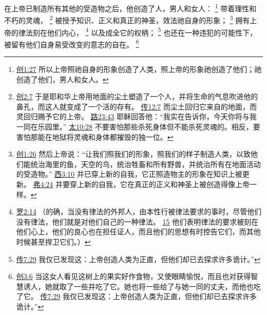 \documentclass[12pt, a4paper, oneside]{ctexart}
\newcounter{parnum}[section]
\newcommand{\N}{%
   \noindent\refstepcounter{parnum}%
    \makebox[\parindent][l]{\textbf{\arabic{parnum}.}}}
\begin{document}
\N 在上帝已制造所有其他的受造物之后，他创造了人，男人和女人：
	\footnote {
		\href{https://biblehub.com/genesis/1-27.htm}{创1:27} 所以上帝照祂自身的形象创造了人类，照上帝的形象祂创造了他们；祂创造了他们，男人和女人。
	}
	带着理性和不朽的灵魂，
	\footnote {
		\href{https://biblehub.com/genesis/2-7.htm}{创2:7} 于是耶和华上帝用地面的尘土塑造了一个人，并将生命的气息吹进他的鼻孔，而这人就变成了一个活的存有。
		\href{https://biblehub.com/ecclesiastes/12-7.htm}{传12:7} 而尘土回归它来自的地面，而灵回归赐予它的上帝。
		\href{https://biblehub.com/luke/23-43.htm}{路23:43} 耶稣回答他：“我实在告诉你，今天你将与我一同在乐园里。”
		\href{https://biblehub.com/matthew/10-28.htm}{太10:28} 不要害怕那些杀死身体但不能杀死灵魂的。相反，要害怕那能在地狱将灵魂和身体都摧毁的独一位。
	}
	被授予知识、正义和真正的神圣，效法祂自身的形象；
	\footnote {
		\href{https://biblehub.com/genesis/1-26.htm}{创1:26} 然后上帝说：“让我们照我们的形象，照我们的样子制造人类，以致他们能统治海里的鱼，天空的鸟，统治牲畜和所有野兽，并统治所有在地面活动的受造物。”
		\href{https://biblehub.com/colossians/3-10.htm}{西3:10} 并已穿上新的自我，它正照造物主的形象在知识上被更新。
		\href{https://biblehub.com/ephesians/4-24.htm}{弗4:24} 并要穿上新的自我，它在真正的正义和神圣上被创造得像上帝一样。
	}
	拥有上帝的律法刻在他们内心，
	\footnote {
		\href{https://biblehub.com/romans/2-14.htm}{罗2:14} （的确，当没有律法的外邦人，由本性行被律法要求的事时，尽管他们没有律法，他们就是对他们自己的一种律法。
		\href{https://biblehub.com/romans/2-15.htm}{15} 他们表明律法的要求被刻在他们心上，他们的良心也在担任证人，而且他们的思想有时控告它们，而其他时候甚至捍卫它们。）
	}
	以及成全它的权柄；
	\footnote {
		\href{https://biblehub.com/ecclesiastes/7-29.htm}{传7:29} 我仅已发现这：上帝创造人类为正直，但他们却已去探求许多诡计。”
	}
	也还在一种违犯的可能性下，被留有他们自身易受改变的意志的自在。
	\footnote {
		\href{https://biblehub.com/genesis/3-6.htm}{创3:6} 当这女人看见这树上的果实好作食物，又使眼睛愉悦，而且也对获得智慧诱人，她就取了一些并吃了它。她也将一些给了与她一同的丈夫，而他也吃了它。
		\href{https://biblehub.com/ecclesiastes/7-29.htm}{传7:29} 我仅已发现这：上帝创造人类为正直，但他们却已去探求许多诡计。”
	}
\end{document}
